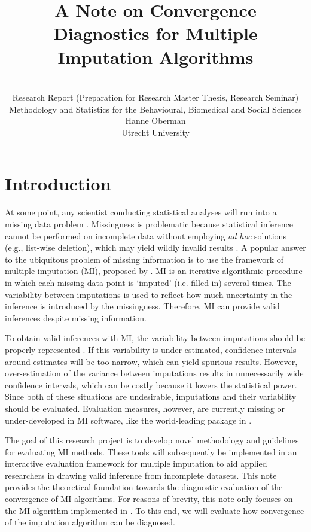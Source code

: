\documentclass[article]{jss}
\author{\\Research Report (Preparation for Research Master Thesis, Research Seminar) \\ Methodology and Statistics for the Behavioural, Biomedical and Social Sciences \AND Hanne Oberman\\Utrecht University}
\title{A Note on Convergence Diagnostics for Multiple Imputation Algorithms}
\begin{document}

\section{Introduction} \label{sec:intro} %

At some point, any scientist conducting statistical analyses will run into a missing data problem \citep{alli02}. Missingness is problematic because statistical inference cannot be performed on incomplete data without employing \emph{ad hoc} solutions (e.g., list-wise deletion), which may yield wildly invalid results \citep{buur18}. A popular answer to the ubiquitous problem of missing information is to use the framework of multiple imputation (MI), proposed by \cite{rubin87}. MI is an iterative algorithmic procedure in which each missing data point is `imputed' (i.e. filled in) several times. The variability between imputations is used to reflect how much uncertainty in the inference is introduced by the missingness. Therefore, MI can provide valid inferences despite missing information. 

To obtain valid inferences with MI, the variability between imputations should be properly represented \citep{rubin87, buur18}. If this variability is under-estimated, confidence intervals around estimates will be too narrow, which can yield spurious results. However, over-estimation of the variance between imputations results in unnecessarily wide confidence intervals, which can be costly because it lowers the statistical power. Since both of these situations are undesirable, imputations and their variability should be evaluated. Evaluation measures, however, are currently missing or under-developed in MI software, like the world-leading  package \citep{mice} in  \citep{R}. %

The goal of this research project is to develop novel methodology and guidelines for evaluating MI methods. These tools will subsequently be implemented in an interactive evaluation framework for multiple imputation to aid applied researchers in drawing valid inference from incomplete datasets. This note provides the theoretical foundation towards the diagnostic evaluation of the convergence of MI algorithms. %
For reasons of brevity, this note only focuses on the MI algorithm implemented in  \citep{mice}. %
To this end, we will evaluate how convergence of the imputation algorithm can be diagnosed.
\end{document}
